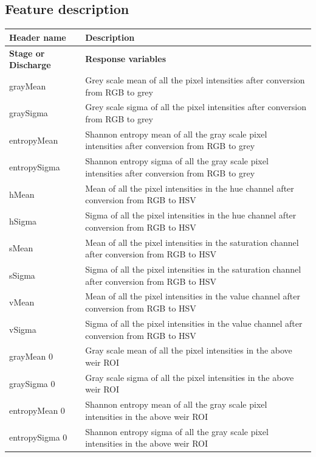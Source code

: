 \documentclass[conference]{IEEEtran}
\begin{document}
\subsection{Feature description}
\begin{table}[H]
\begin{center}
\begin{tabular}{|m{5em}|m{17em}|} 
 \hline
 \textbf{Header name} & \textbf{Description} \\ 
 \hline
 \textbf{Stage or Discharge} & \textbf{Response variables} \\ 
 \hline
 grayMean & Grey scale mean of all the pixel intensities after conversion from RGB to grey \\
 \hline
 graySigma & Grey scale sigma of all the pixel intensities after conversion from RGB to grey \\
 \hline
 entropyMean & Shannon entropy mean of all the gray scale pixel intensities after conversion from RGB to grey \\
 \hline
 entropySigma & Shannon entropy sigma of all the gray scale pixel intensities after conversion from RGB to grey \\
 \hline
 hMean & Mean of all the pixel intensities in the hue channel after conversion from RGB to HSV \\
 \hline
 hSigma & Sigma of all the pixel intensities in the hue channel after conversion from RGB to HSV \\
 \hline
 sMean & Mean of all the pixel intensities in the saturation channel after conversion from RGB to HSV \\
 \hline
 sSigma & Sigma of all the pixel intensities in the saturation channel after conversion from RGB to HSV \\
 \hline
 vMean & Mean of all the pixel intensities in the value channel after conversion from RGB to HSV \\
 \hline
 vSigma & Sigma of all the pixel intensities in the value channel after conversion from RGB to HSV \\  
 \hline
 grayMean 0 & Gray scale mean of all the pixel intensities in the above weir ROI \\
 \hline
 graySigma 0 & Gray scale sigma of all the pixel intensities in the above weir ROI \\
 \hline
 entropyMean 0 & Shannon entropy mean of all the gray scale pixel intensities in the above weir ROI \\
 \hline
 entropySigma 0 & Shannon entropy sigma of all the gray scale pixel intensities in the above weir ROI \\

\end{tabular}
\end{center}
\end{table}
\end{document}

